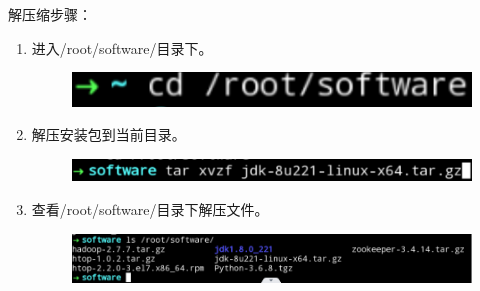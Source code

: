 \documentclass {article}
\begin{document}
				解压缩步骤：
				\begin{enumerate}
					\item 进入/root/software/目录下。
						\begin{figure}[H]
							\centering
							\includegraphics{figures/fig2.jpg}
						\end{figure}
					
					\item 解压安装包到当前目录。
						\begin{figure}[H]
							\centering
							\includegraphics[width=4.5in]{figures/fig3.jpg}
						\end{figure}
					
					\item 查看/root/software/目录下解压文件。
						\begin{figure}[H]
							\centering
							\includegraphics[width=4.5in]{figures/fig4.jpg}
						\end{figure}
				\end{enumerate}
		
\end{document}
